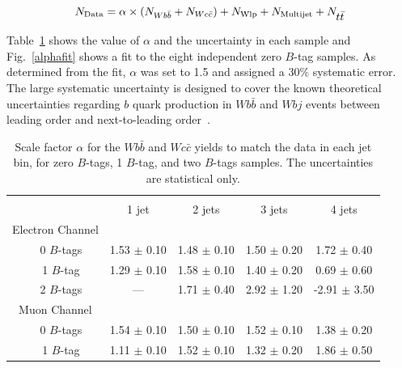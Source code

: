 \begin{equation}
\label{alphaparam}
N_{\rm{Data}} = \alpha \times (N_{Wb\bar{b}} + N_{Wc\bar{c}}) + N_{\rm{W\rm{lp}}} + N_{\rm{Multijet}} + N_{\mbox{$t\bar{t}$}}
\end{equation}

\noindent Table~\ref{alphatable} shows the value of $\alpha$ and the uncertainty in each sample and Fig.~\ref{alphafit} shows a fit to the eight independent zero $B$-tag samples. As determined from the fit, $\alpha$ was set to 1.5 and assigned a $30\%$ systematic error. The large systematic uncertainty is designed to cover the known theoretical uncertainties regarding $b$ quark production in $Wb\bar{b}$ and $Wbj$ events between leading order and next-to-leading order~\cite{PhysRevD.60.011501,2006PhRvD..74c4007C,Campbell:2006cu}.

\begin{table}[!h!tbp]
\begin{center}
\caption{Scale factor $\alpha$ for the $Wb\bar{b}$ and
$Wc\bar{c}$ yields to match the data in each jet bin, for zero $B$-tags, 1
$B$-tag, and two $B$-tags samples. The uncertainties are statistical only.}
\label{alphatable}
\begin{tabular}{c|cccc}
\vspace{0.1in} \\
                 &     1 jet      &      2 jets     &      3 jets     &       4 jets     \\
\hline
Electron Channel  &                 &                 &                 &                  \\
~~0 $B$-tags          & 1.53 $\pm$ 0.10 & 1.48 $\pm$ 0.10 & 1.50 $\pm$ 0.20 &  1.72 $\pm$ 0.40 \\
~~1 $B$-tag           & 1.29 $\pm$ 0.10 & 1.58 $\pm$ 0.10 & 1.40 $\pm$ 0.20 &  0.69 $\pm$ 0.60 \\
~~2 $B$-tags          &       ---       & 1.71 $\pm$ 0.40 & 2.92 $\pm$ 1.20 & -2.91 $\pm$ 3.50 \\
Muon Channel      &                 &                 &                 &                  \\
~~0 $B$-tags          & 1.54 $\pm$ 0.10 & 1.50 $\pm$ 0.10 & 1.52 $\pm$ 0.10 &  1.38 $\pm$ 0.20 \\
~~1 $B$-tag           & 1.11 $\pm$ 0.10 & 1.52 $\pm$ 0.10 & 1.32 $\pm$ 0.20 &  1.86 $\pm$ 0.50 \\

\end{tabular}
\end{center}
\end{table}
